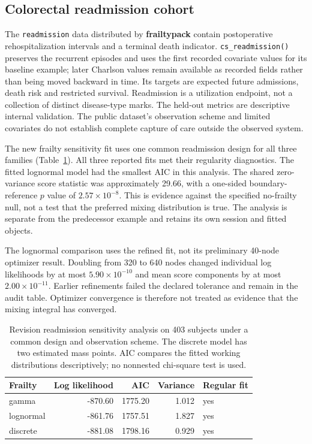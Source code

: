 \documentclass[article,nojss]{jss}
\newcommand{\pkg}[1]{\textbf{#1}}
\newcommand{\code}[1]{\texttt{#1}}
\begin{document}
\subsection{Colorectal readmission cohort}
The \code{readmission} data distributed by \pkg{frailtypack} contain postoperative rehospitalization intervals and a terminal death indicator. \code{cs\_readmission()} preserves the recurrent episodes and uses the first recorded covariate values for its baseline example; later Charlson values remain available as recorded fields rather than being moved backward in time. Its targets are expected future admissions, death risk and restricted survival. Readmission is a utilization endpoint, not a collection of distinct disease-type marks. The held-out metrics are descriptive internal validation. The public dataset's observation scheme and limited covariates do not establish complete capture of care outside the observed system.

The new frailty sensitivity fit uses one common readmission design for all three families (Table~\ref{tab:frailty}). All three reported fits met their regularity diagnostics. The fitted lognormal model had the smallest AIC in this analysis. The shared zero-variance score statistic was approximately 29.66, with a one-sided boundary-reference $p$ value of $2.57\times10^{-8}$. This is evidence against the specified no-frailty null, not a test that the preferred mixing distribution is true. The analysis is separate from the predecessor example and retains its own session and fitted objects.

The lognormal comparison uses the refined fit, not its preliminary 40-node optimizer result. Doubling from 320 to 640 nodes changed individual log likelihoods by at most $5.90\times10^{-10}$ and mean score components by at most $2.00\times10^{-11}$. Earlier refinements failed the declared tolerance and remain in the audit table. Optimizer convergence is therefore not treated as evidence that the mixing integral has converged.

\begin{table}[tbp]\centering\small
\begin{tabular}{lrrrl}\toprule
Frailty & Log likelihood & AIC & Variance & Regular fit \\ \midrule
gamma & -870.60 & 1775.20 & 1.012 & yes \\
lognormal & -861.76 & 1757.51 & 1.827 & yes \\
discrete & -881.08 & 1798.16 & 0.929 & yes \\
\bottomrule\end{tabular}
\caption{Revision readmission sensitivity analysis on 403 subjects under a common design and observation scheme. The discrete model has two estimated mass points. AIC compares the fitted working distributions descriptively; no nonnested chi-square test is used.}\label{tab:frailty}
\end{table}
\end{document}
